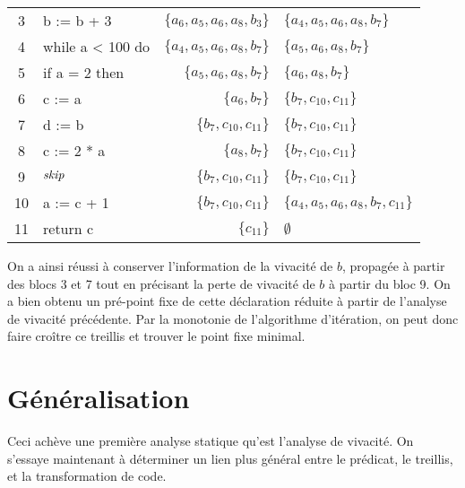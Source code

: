 \documentclass[a4paper, 10pt]{article}
\begin{document}
\begin{example}
\begin{center}
\begin{tabular}{||c|l|r|l||}
	3 & b := b + 3 & $\{a_6, a_5, a_6, a_8, b_3\}$ & $\{a_4, a_5, a_6, a_8, b_7\}$\\
	4 & while a < 100 do & $\{a_4, a_5, a_6, a_8, b_7\}$ & $\{a_5, a_6, a_8, b_7\}$\\
	5 & if a = 2 then & $\{a_5, a_6, a_8, b_7\}$ & $\{a_6, a_8, b_7\}$\\
	6 & c := a & $\{a_6, b_7\}$ & $\{b_7, c_{10}, c_{11}\}$\\
	7 & d := b & $\{b_7, c_{10}, c_{11}\}$ & $\{b_7, c_{10}, c_{11}\}$\\
	8 & c := 2 * a & $\{a_8, b_7\}$ & $\{b_7, c_{10}, c_{11}\}$\\
	9 & $\textit{skip}$ & $\{b_7, c_{10}, c_{11}\}$ & $\{b_7, c_{10}, c_{11}\}$\\
	10 & a := c + 1 & $\{b_7, c_{10}, c_{11}\}$ & $\{a_4, a_5, a_6, a_8, b_7, c_{11}\}$\\
	11 & return c & $\{c_{11}\}$ & $\emptyset$\\
	\hline
	\end{tabular}
\end{center}
On a ainsi réussi à conserver l'information de la vivacité de $b$, propagée à partir des blocs 3 et 7 tout en précisant
la perte de vivacité de $b$ à partir du bloc 9.
On a bien obtenu un pré-point fixe de cette déclaration réduite à partir de l'analyse de vivacité précédente.
Par la monotonie de l'algorithme d'itération, on peut donc faire croître ce treillis et trouver le point fixe minimal.
\end{example}
\section{Généralisation}
Ceci achève une première analyse statique qu'est l'analyse de vivacité. On s'essaye maintenant à déterminer
un lien plus général entre le prédicat, le treillis, et la transformation de code.
\end{document}
